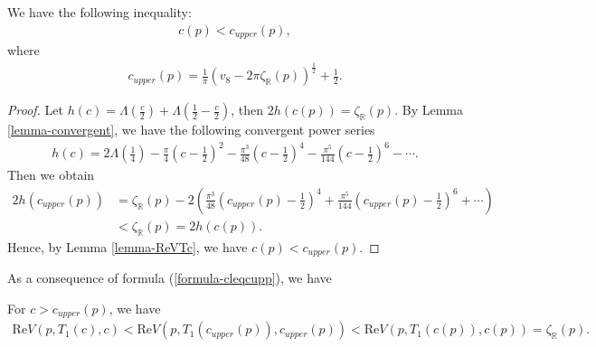 \documentclass[12pt]{amsart}
\begin{document}
\begin{lemma}
We have the following inequality:
\begin{align}  \label{formula-cleqcupp}
c(p)<c_{upper}(p),
\end{align}
where 
\begin{align} 
    c_{upper}(p)=\frac{1}{\pi}(v_8-2\pi\zeta_{\mathbb{R}}(p))^{\frac{1}{2}}+\frac{1}{2}.
\end{align}
\end{lemma}
\begin{proof}
Let $h(c)=\Lambda(\frac{c}{2})+\Lambda(\frac{1}{2}-\frac{c}{2})$, then
$2h(c(p))=\zeta_{\mathbb{R}}(p)$. 
 By Lemma \ref{lemma-convergent}, we have the following convergent power series
\begin{align}
    h(c)=2\Lambda\left(\frac{1}{4}\right)-\frac{\pi}{4}\left(c-\frac{1}{2}\right)^2-\frac{\pi^3}{48}\left(c-\frac{1}{2}\right)^4-\frac{\pi^5}{144}\left(c-\frac{1}{2}\right)^6-\cdots. 
\end{align}
Then we obtain 
\begin{align}
    2h(c_{upper}(p))&=\zeta_{\mathbb{R}}(p)-2\left(\frac{\pi^3}{48}\left(c_{upper}(p)-\frac{1}{2}\right)^4+\frac{\pi^5}{144}\left(c_{upper}(p)-\frac{1}{2}\right)^6+\cdots\right)\\\nonumber
    &<\zeta_{\mathbb{R}}(p)=2 h(c(p)).
\end{align}
Hence, by Lemma \ref{lemma-ReVTc}, we have $c(p)<c_{upper}(p)$. 
\end{proof}

As a consequence of formula (\ref{formula-cleqcupp}), we have
\begin{corollary} \label{coro-ReV1}
   For $c>c_{upper}(p)$, we have 
   \begin{align*}
   \text{Re} V(p,T_1(c),c)<\text{Re} V(p,T_1(c_{upper}(p)),c_{upper}(p))<\text{Re} V(p,T_1(c(p)),c(p))=\zeta_{\mathbb{R}}(p).
   \end{align*}
\end{corollary}
    
\end{document}
